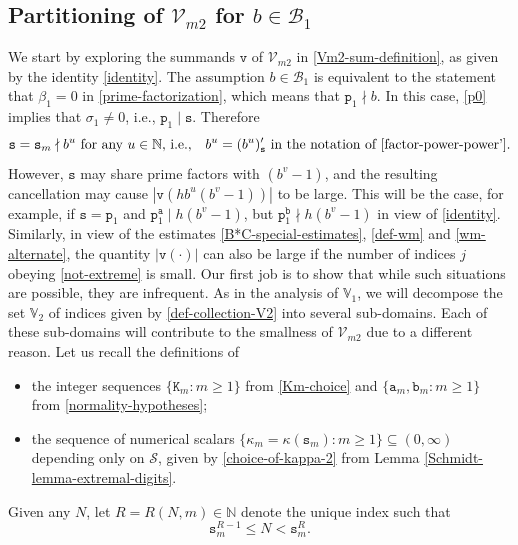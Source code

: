 \documentclass[12pt, twoside]{article}
\theoremstyle{definition}
\numberwithin{equation}{section}
\begin{document}
\subsection{Partitioning of $\mathcal V_{m2}$ for $b \in \mathscr{B}_1$} 
We start by exploring the summands $\mathtt v$ of $\mathcal V_{m2}$ in \eqref{Vm2-sum-definition}, as given by the identity \eqref{identity}. The assumption $b \in \mathscr{B}_1$ is equivalent to the statement that $\beta_1= 0$ in \eqref{prime-factorization}, which means that $\mathtt p_1 \nmid b$. In this case, \eqref{p0} implies that $\sigma_1 \ne 0$, i.e., $\mathtt p_1 \mid \mathtt s$. Therefore 
\begin{equation}  \label{sb-case1}
\mathtt s = \mathtt s_m \nmid b^u \text{ for any $u \in \mathbb N$, i.e.,} \quad  b^u = (b^u)'_{\mathtt s} \text{ in the notation of \eqref{factor-power-power'}}. \end{equation}   However, $\mathtt s$ may share prime factors with $(b^v-1)$, and the resulting cancellation may cause $|\mathtt v(hb^u(b^v-1))|$ to be large. This will be the case, for example, if $\mathtt s = \mathtt p_1$ and $\mathtt p_1^{\mathtt a} \mid h(b^v-1)$, but $\mathtt p_1^{\mathtt b} \nmid h(b^v-1)$ in view of \eqref{identity}. Similarly, in view of the estimates \eqref{B*C-special-estimates}, \eqref{def-wm} and \eqref{wm-alternate}, the quantity $|\mathtt v(\cdot)|$ can also be large if the number of indices $j$ obeying \eqref{not-extreme} is small. Our first job is to show that while such situations are possible, they are infrequent. 
\vskip0.1in 
\noindent As in the analysis of $\mathbb V_1$,  we will decompose the set $\mathbb V_2$ of indices given by \eqref{def-collection-V2} into several sub-domains. Each of these sub-domains will contribute to the smallness of $\mathcal V_{m2}$ due to a different reason. Let us recall the definitions of 
\begin{itemize} 
\item the integer sequences $\{\mathtt K_m : m \geq 1\}$ from \eqref{Km-choice} and $\{\mathtt a_m, \mathtt b_m: m \geq 1\}$ from \eqref{normality-hypotheses}; 
\item the sequence of numerical scalars $\{\kappa_m = \kappa(\mathtt s_m): m \geq 1\} \subseteq (0, \infty)$ depending only on $\mathcal S$, given by \eqref{choice-of-kappa-2} from Lemma \ref{Schmidt-lemma-extremal-digits}. \label{kappa-crossref}
\end{itemize} 
\noindent Given any $N$, let $R = R(N, m)\in \mathbb N$ denote the unique index such that 
\begin{equation} \mathtt s_m^{R-1} \leq N < \mathtt s_m^R.  \label{N-and-R} \end{equation}
\end{document}
